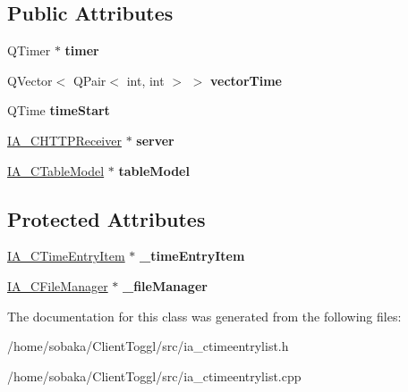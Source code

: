 \subsection*{Public Attributes}
\begin{DoxyCompactItemize}
\item 
\mbox{\label{classIA__CTimeEntryList_a25f8a53f4d048492b61fca26b711270d}} 
Q\+Timer $\ast$ {\bfseries timer}
\item 
\mbox{\label{classIA__CTimeEntryList_ad1ed878f7c91ef752eb4935278122d24}} 
Q\+Vector$<$ Q\+Pair$<$ int, int $>$ $>$ {\bfseries vector\+Time}
\item 
\mbox{\label{classIA__CTimeEntryList_a8e345bb320dc7b0947eb78e28e035cb0}} 
Q\+Time {\bfseries time\+Start}
\item 
\mbox{\label{classIA__CTimeEntryList_aaae0ad4aed8709bdf30e9537599f224c}} 
\hyperlink{classIA__CHTTPReceiver}{I\+A\+\_\+\+C\+H\+T\+T\+P\+Receiver} $\ast$ {\bfseries server}
\item 
\mbox{\label{classIA__CTimeEntryList_a1d38e3e6709fc47155ca95432397fef6}} 
\hyperlink{classIA__CTableModel}{I\+A\+\_\+\+C\+Table\+Model} $\ast$ {\bfseries table\+Model}
\end{DoxyCompactItemize}
\subsection*{Protected Attributes}
\begin{DoxyCompactItemize}
\item 
\mbox{\label{classIA__CTimeEntryList_aa69b6e54b7d62ef2c2a0fd9b5d55f28c}} 
\hyperlink{classIA__CTimeEntryItem}{I\+A\+\_\+\+C\+Time\+Entry\+Item} $\ast$ {\bfseries \+\_\+time\+Entry\+Item}
\item 
\mbox{\label{classIA__CTimeEntryList_aca02f413cd5ad573158999aae11e42b6}} 
\hyperlink{classIA__CFileManager}{I\+A\+\_\+\+C\+File\+Manager} $\ast$ {\bfseries \+\_\+file\+Manager}
\end{DoxyCompactItemize}


The documentation for this class was generated from the following files\+:\begin{DoxyCompactItemize}
\item 
/home/sobaka/\+Client\+Toggl/src/ia\+\_\+ctimeentrylist.\+h\item 
/home/sobaka/\+Client\+Toggl/src/ia\+\_\+ctimeentrylist.\+cpp\end{DoxyCompactItemize}
